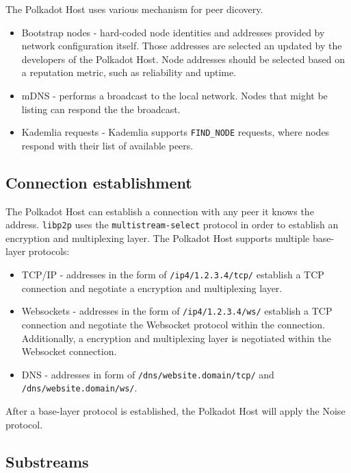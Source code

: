 The Polkadot Host uses various mechanism for peer dicovery.

\begin{itemize}
    \item Bootstrap nodes - hard-coded node identities and addresses provided by
    network configuration itself. Those addresses are selected an updated by the
    developers of the Polkadot Host. Node addresses should be selected based on
    a reputation metric, such as reliability and uptime.
    \item mDNS - performs a broadcast to the local network. Nodes that might be
    listing can respond the the broadcast.
    \item Kademlia requests - Kademlia supports \verb|FIND_NODE| requests, where
    nodes respond with their list of available peers.
\end{itemize}

\subsection{Connection establishment}

The Polkadot Host can establish a connection with any peer it knows the address.
\verb|libp2p| uses the \verb|multistream-select| protocol in order to establish
an encryption and multiplexing layer. The Polkadot Host supports multiple
base-layer protocols:

\begin{itemize}
    \item TCP/IP - addresses in the form of \verb|/ip4/1.2.3.4/tcp/| establish a
    TCP connection and negotiate a encryption and multiplexing layer.
    \item Websockets - addresses in the form of \verb|/ip4/1.2.3.4/ws/|
    establish a TCP connection and negotiate the Websocket protocol within the
    connection. Additionally, a encryption and multiplexing layer is negotiated
    within the Websocket connection.
    \item DNS - addresses in form of \verb|/dns/website.domain/tcp/| and
    \verb|/dns/website.domain/ws/|.
\end{itemize}

After a base-layer protocol is established, the Polkadot Host will apply the
Noise protocol.

\subsection{Substreams}

